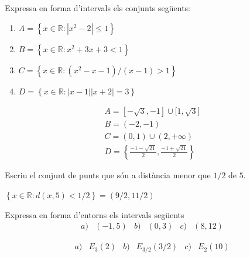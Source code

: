 \begin{exercici}
Expressa en forma d’intervals els conjunts següents:

\begin{enumerate}
\item[a)] $A=\left\{ x\in \mathbb{R}:\left\vert x^{2}-2\right\vert \leq
1\right\} $

\item[b)] $B=\left\{ x\in \mathbb{R}:x^{2}+3x+3<1\right\} $

\item[c)] $C=\left\{ x\in \mathbb{R}:(x^{2}-x-1)/(x-1)>1\right\} $

\item[d)] $D=\left\{ x\in \mathbb{R}:\left\vert x-1\right\vert \left\vert
x+2\right\vert =3\right\} $
\end{enumerate}

\end{exercici}

\begin{indicacio}
%
\[
\begin{array}{l}
A=[-\sqrt{3},-1]\cup \lbrack 1,\sqrt{3}] \\ 
B=(-2,-1) \\ 
C=(0,1)\cup (2,+\infty ) \\ 
D=\left\{ \frac{-1-\sqrt{21}}{2},\frac{-1+\sqrt{21}}{2}\right\}%
\end{array}%
\]
\end{indicacio}

\begin{exercici}
Escriu el conjunt de punts que són a distància menor que $1/2$ de $5$.

\end{exercici}

\begin{indicacio}
$\left\{ x\in \mathbb{R}:d(x,5)<1/2\right\} =(9/2,11/2)$
\end{indicacio}

\begin{exercici}
Expressa en forma d’entorns els intervals següents%
\[
\begin{array}{cccccc}
a) & (-1,5) & b) & (0,3) & c) & (8,12)%
\end{array}%
\]

\end{exercici}

\begin{indicacio}
%
\[
\begin{array}{cccccc}
a) & E_{3}(2) & b) & E_{3/2}(3/2) & c) & E_{2}(10)%
\end{array}%
\]
\end{indicacio}

